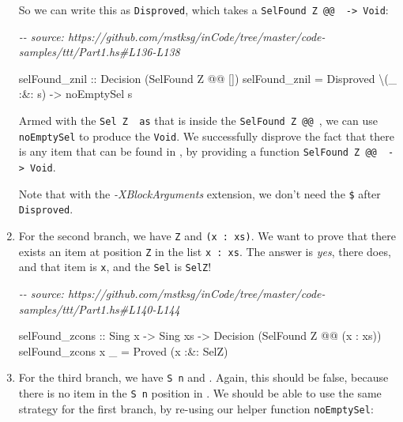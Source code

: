 \documentclass[]{article}
\newenvironment{Shaded}{}{}
\newcommand{\CommentTok}[1]{\textcolor[rgb]{0.38,0.63,0.69}{\textit{#1}}}
\newcommand{\DataTypeTok}[1]{\textcolor[rgb]{0.56,0.13,0.00}{#1}}
\newcommand{\NormalTok}[1]{#1}
\newcommand{\OperatorTok}[1]{\textcolor[rgb]{0.40,0.40,0.40}{#1}}
\newcommand{\OtherTok}[1]{\textcolor[rgb]{0.00,0.44,0.13}{#1}}
\begin{document}
\begin{enumerate}
  So we can write this as \texttt{Disproved}, which takes a
  \texttt{SelFound\ \textquotesingle{}Z\ @@\ \textquotesingle{}{[}{]}\ -\textgreater{}\ Void}:

\begin{Shaded}
\begin{Highlighting}[]
\CommentTok{{-}{-} source: https://github.com/mstksg/inCode/tree/master/code{-}samples/ttt/Part1.hs\#L136{-}L138}

\NormalTok{selFound\_znil}
\OtherTok{    ::} \DataTypeTok{Decision}\NormalTok{ (}\DataTypeTok{SelFound} \DataTypeTok{\textquotesingle{}Z} \OperatorTok{@@}\NormalTok{ \textquotesingle{}[])}
\NormalTok{selFound\_znil }\OtherTok{=} \DataTypeTok{Disproved}\NormalTok{ \textbackslash{}(\_ }\OperatorTok{:\&:}\NormalTok{ s) }\OtherTok{{-}>}\NormalTok{ noEmptySel s}
\end{Highlighting}
\end{Shaded}

  Armed with the \texttt{Sel\ \textquotesingle{}Z\ \textquotesingle{}{[}{]}\ as}
  that is inside the
  \texttt{SelFound\ \textquotesingle{}Z\ @@\ \textquotesingle{}{[}{]}}, we can
  use \texttt{noEmptySel} to produce the \texttt{Void}. We successfully disprove
  the fact that there is any item that can be found in
  \texttt{\textquotesingle{}{[}{]}}, by providing a function
  \texttt{SelFound\ \textquotesingle{}Z\ @@\ \textquotesingle{}{[}{]}\ -\textgreater{}\ Void}.

  Note that with the \emph{-XBlockArguments} extension, we don't need the
  \texttt{\$} after \texttt{Disproved}.
\item
  For the second branch, we have \texttt{\textquotesingle{}Z} and
  \texttt{(x\ \textquotesingle{}:\ xs)}. We want to prove that there exists an
  item at position \texttt{\textquotesingle{}Z} in the list
  \texttt{x\ \textquotesingle{}:\ xs}. The answer is \emph{yes}, there does, and
  that item is \texttt{x}, and the \texttt{Sel} is \texttt{SelZ}!

\begin{Shaded}
\begin{Highlighting}[]
\CommentTok{{-}{-} source: https://github.com/mstksg/inCode/tree/master/code{-}samples/ttt/Part1.hs\#L140{-}L144}

\NormalTok{selFound\_zcons}
\OtherTok{    ::} \DataTypeTok{Sing}\NormalTok{ x}
    \OtherTok{{-}>} \DataTypeTok{Sing}\NormalTok{ xs}
    \OtherTok{{-}>} \DataTypeTok{Decision}\NormalTok{ (}\DataTypeTok{SelFound} \DataTypeTok{\textquotesingle{}Z} \OperatorTok{@@}\NormalTok{ (x \textquotesingle{}}\OperatorTok{:}\NormalTok{ xs))}
\NormalTok{selFound\_zcons x \_ }\OtherTok{=} \DataTypeTok{Proved}\NormalTok{ (x }\OperatorTok{:\&:} \DataTypeTok{SelZ}\NormalTok{)}
\end{Highlighting}
\end{Shaded}
\item
  For the third branch, we have \texttt{\textquotesingle{}S\ n} and
  \texttt{\textquotesingle{}{[}{]}}. Again, this should be false, because there
  is no item in the \texttt{\textquotesingle{}S\ n} position in
  \texttt{\textquotesingle{}{[}{]}}. We should be able to use the same strategy
  for the first branch, by re-using our helper function \texttt{noEmptySel}:


\end{enumerate}
\end{document}
